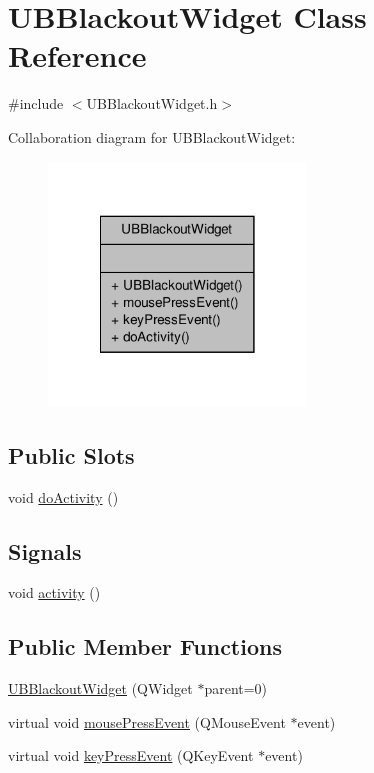 \hypertarget{class_u_b_blackout_widget}{\section{U\-B\-Blackout\-Widget Class Reference}
\label{d3/dff/class_u_b_blackout_widget}
}


{\ttfamily \#include $<$U\-B\-Blackout\-Widget.\-h$>$}



Collaboration diagram for U\-B\-Blackout\-Widget\-:
\nopagebreak
\begin{figure}[H]
\begin{center}
\leavevmode
\includegraphics[width=194pt]{d8/d3c/class_u_b_blackout_widget__coll__graph}
\end{center}
\end{figure}
\subsection*{Public Slots}
\begin{DoxyCompactItemize}
\item 
void \hyperlink{class_u_b_blackout_widget_aa92412b12820f8254c73e590b2bea256}{do\-Activity} ()
\end{DoxyCompactItemize}
\subsection*{Signals}
\begin{DoxyCompactItemize}
\item 
void \hyperlink{class_u_b_blackout_widget_ac6a1eb4f9dbbc35cb55ec89509cbc7b0}{activity} ()
\end{DoxyCompactItemize}
\subsection*{Public Member Functions}
\begin{DoxyCompactItemize}
\item 
\hyperlink{class_u_b_blackout_widget_a115212b60032af1655c0bfc002c26d26}{U\-B\-Blackout\-Widget} (Q\-Widget $\ast$parent=0)
\item 
virtual void \hyperlink{class_u_b_blackout_widget_a87caea3f690e97c9a0e58fb4c407cea2}{mouse\-Press\-Event} (Q\-Mouse\-Event $\ast$event)
\item 
virtual void \hyperlink{class_u_b_blackout_widget_a6cb2a676e1a5cc821cdbdcaa50f9e250}{key\-Press\-Event} (Q\-Key\-Event $\ast$event)
\end{DoxyCompactItemize}


